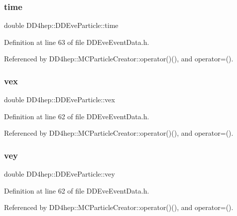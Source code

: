 \subsubsection{\texorpdfstring{time}{time}}
{\footnotesize\ttfamily double D\+D4hep\+::\+D\+D\+Eve\+Particle\+::time}



Definition at line 63 of file D\+D\+Eve\+Event\+Data.\+h.



Referenced by D\+D4hep\+::\+M\+C\+Particle\+Creator\+::operator()(), and operator=().

\hypertarget{class_d_d4hep_1_1_d_d_eve_particle_ae4631ff73de167405ea1c680f5217172}{}\label{class_d_d4hep_1_1_d_d_eve_particle_ae4631ff73de167405ea1c680f5217172} 
\subsubsection{\texorpdfstring{vex}{vex}}
{\footnotesize\ttfamily double D\+D4hep\+::\+D\+D\+Eve\+Particle\+::vex}



Definition at line 62 of file D\+D\+Eve\+Event\+Data.\+h.



Referenced by D\+D4hep\+::\+M\+C\+Particle\+Creator\+::operator()(), and operator=().

\hypertarget{class_d_d4hep_1_1_d_d_eve_particle_a3e6f78f4ccc5d78ae52a28c33fcf0b44}{}\label{class_d_d4hep_1_1_d_d_eve_particle_a3e6f78f4ccc5d78ae52a28c33fcf0b44} 
\subsubsection{\texorpdfstring{vey}{vey}}
{\footnotesize\ttfamily double D\+D4hep\+::\+D\+D\+Eve\+Particle\+::vey}



Definition at line 62 of file D\+D\+Eve\+Event\+Data.\+h.



Referenced by D\+D4hep\+::\+M\+C\+Particle\+Creator\+::operator()(), and operator=().

\hypertarget{class_d_d4hep_1_1_d_d_eve_particle_ad573d5c2205c4d4c6908637c34f9233a}{}\label{class_d_d4hep_1_1_d_d_eve_particle_ad573d5c2205c4d4c6908637c34f9233a} 
